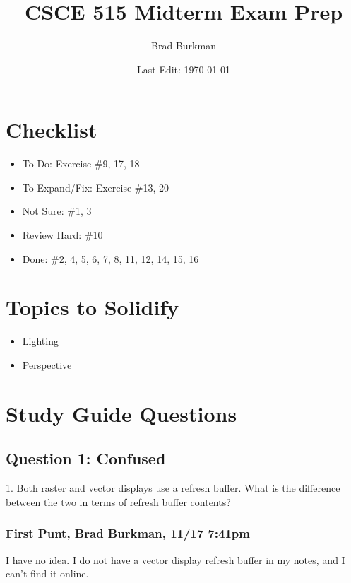 \documentclass[11pt]{article}
\title{CSCE 515 Midterm Exam Prep}
\author{Brad Burkman}
\date{Last Edit: \today}
\begin{document}
\setlength{\parindent}{20pt}
\begin{spacing}{1.2}
\maketitle

\section{Checklist}

\begin{itemize}
	\item To Do:  Exercise \#9, 17, 18
	\item To Expand/Fix:  Exercise \#13, 20
	\item Not Sure:  \#1, 3
	\item Review Hard:  \#10
	\item Done:  \#2,  4, 5, 6, 7, 8, 11, 12, 14, 15, 16
\end{itemize}

\section{Topics to Solidify}

\begin{itemize}
	\item Lighting
	\item Perspective
\end{itemize}

\tableofcontents

\section{Study Guide Questions}

\subsection{Question 1:  Confused}
1.  Both raster and vector displays use a refresh buffer.  What is the difference between the two in terms of refresh buffer contents?

\subsubsection{First Punt, Brad Burkman, 11/17 7:41pm}

I have no idea.  I do not have a vector display refresh buffer in my notes, and I can't find it online.  


\end{spacing}
\end{document}
